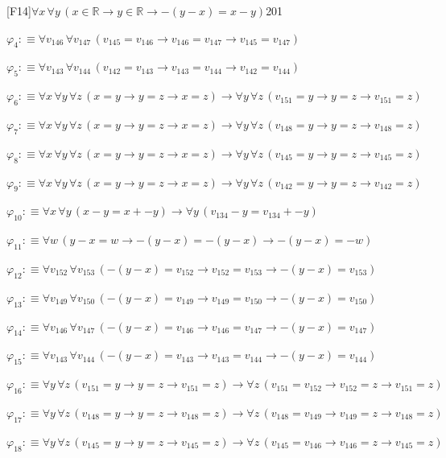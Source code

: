 \begin{fullproof}{[F14]}{$\forall x\,\forall y\,(x \in \mathbb{R} \to y \in \mathbb{R} \to -(y - x) = x - y)$}{201}
\begin{abbrevlist}
\item $\varphi_{4} :\equiv \forall v_{146}\,\forall v_{147}\,(v_{145} = v_{146} \to v_{146} = v_{147} \to v_{145} = v_{147})$
\item $\varphi_{5} :\equiv \forall v_{143}\,\forall v_{144}\,(v_{142} = v_{143} \to v_{143} = v_{144} \to v_{142} = v_{144})$
\item $\varphi_{6} :\equiv \forall x\,\forall y\,\forall z\,(x = y \to y = z \to x = z) \to \forall y\,\forall z\,(v_{151} = y \to y = z \to v_{151} = z)$
\item $\varphi_{7} :\equiv \forall x\,\forall y\,\forall z\,(x = y \to y = z \to x = z) \to \forall y\,\forall z\,(v_{148} = y \to y = z \to v_{148} = z)$
\item $\varphi_{8} :\equiv \forall x\,\forall y\,\forall z\,(x = y \to y = z \to x = z) \to \forall y\,\forall z\,(v_{145} = y \to y = z \to v_{145} = z)$
\item $\varphi_{9} :\equiv \forall x\,\forall y\,\forall z\,(x = y \to y = z \to x = z) \to \forall y\,\forall z\,(v_{142} = y \to y = z \to v_{142} = z)$
\item $\varphi_{10} :\equiv \forall x\,\forall y\,(x - y = x + -y) \to \forall y\,(v_{134} - y = v_{134} + -y)$
\item $\varphi_{11} :\equiv \forall w\,(y - x = w \to -(y - x) = -(y - x) \to -(y - x) = -w)$
\item $\varphi_{12} :\equiv \forall v_{152}\,\forall v_{153}\,(-(y - x) = v_{152} \to v_{152} = v_{153} \to -(y - x) = v_{153})$
\item $\varphi_{13} :\equiv \forall v_{149}\,\forall v_{150}\,(-(y - x) = v_{149} \to v_{149} = v_{150} \to -(y - x) = v_{150})$
\item $\varphi_{14} :\equiv \forall v_{146}\,\forall v_{147}\,(-(y - x) = v_{146} \to v_{146} = v_{147} \to -(y - x) = v_{147})$
\item $\varphi_{15} :\equiv \forall v_{143}\,\forall v_{144}\,(-(y - x) = v_{143} \to v_{143} = v_{144} \to -(y - x) = v_{144})$
\item $\varphi_{16} :\equiv \forall y\,\forall z\,(v_{151} = y \to y = z \to v_{151} = z) \to \forall z\,(v_{151} = v_{152} \to v_{152} = z \to v_{151} = z)$
\item $\varphi_{17} :\equiv \forall y\,\forall z\,(v_{148} = y \to y = z \to v_{148} = z) \to \forall z\,(v_{148} = v_{149} \to v_{149} = z \to v_{148} = z)$
\item $\varphi_{18} :\equiv \forall y\,\forall z\,(v_{145} = y \to y = z \to v_{145} = z) \to \forall z\,(v_{145} = v_{146} \to v_{146} = z \to v_{145} = z)$

\end{abbrevlist}
\end{fullproof}
